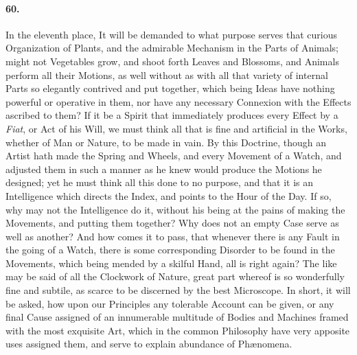 \documentclass[]{article}
\newenvironment{sectionbody}{\begin{multicols}{2}}{\end{multicols}}
\begin{document}
\begin{sectionbody}
\paragraph{60.} In the eleventh place, It will be demanded to what purpose serves
that curious Organization of Plants, and the admirable Mechanism
in the Parts of Animals; might not Vegetables grow, and shoot
forth Leaves and Blossoms, and Animals perform all their Motions,
as well without as with all that variety of internal Parts so
elegantly contrived and put together, which being Ideas have
nothing powerful or operative in them, nor have any necessary
Connexion with the Effects ascribed to them? If it be a Spirit
that immediately produces every Effect by a \emph{Fiat}, or Act
of his Will, we must think all that is fine and artificial in the
Works, whether of Man or Nature, to be made in vain.  By this
Doctrine, though an Artist hath made the Spring and Wheels, and
every Movement of a Watch, and adjusted them in such a manner as
he knew would produce the Motions he designed; yet he must think
all this done to no purpose, and that it is an Intelligence which
directs the Index, and points to the Hour of the Day.  If so, why
may not the Intelligence do it, without his being at the pains of
making the Movements, and putting them together? Why does not an
empty Case serve as well as another? And how comes it to pass,
that whenever there is any Fault in the going of a Watch, there
is some corresponding Disorder to be found in the Movements,
which being mended by a skilful Hand, all is right again?  The
like may be said of all the Clockwork of Nature, great part
whereof is so wonderfully fine and subtile, as scarce to be
discerned by the best Microscope.  In short, it will be asked,
how upon our Principles any tolerable Account can be given, or
any final Cause assigned of an innumerable multitude of Bodies
and Machines framed with the most exquisite Art, which in the
common Philosophy have very apposite uses assigned them, and
serve to explain abundance of Ph{\ae}nomena.




\end{sectionbody}
\end{document}
